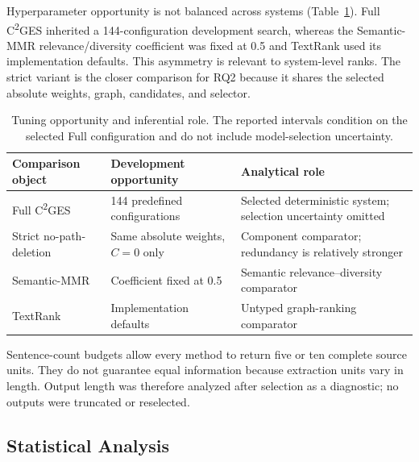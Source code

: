 \documentclass[applsci,article,submit,moreauthors]{Definitions/mdpi}
\newcommand{\cges}{C\textsuperscript{2}GES}
\begin{document}
Hyperparameter opportunity is not balanced across systems (Table~\ref{tab:tuning-opportunity}). Full \cges{} inherited a 144-configuration development search, whereas the Semantic-MMR relevance/diversity coefficient was fixed at 0.5 and TextRank used its implementation defaults. This asymmetry is relevant to system-level ranks. The strict variant is the closer comparison for RQ2 because it shares the selected absolute weights, graph, candidates, and selector.

\begin{table}[H]
\caption{Tuning opportunity and inferential role. The reported intervals condition on the selected Full configuration and do not include model-selection uncertainty.}
\label{tab:tuning-opportunity}\centering\small
\begin{tabular}{p{}p{}p{}}
\toprule
Comparison object & Development opportunity & Analytical role\\
\midrule
Full \cges{} & 144 predefined configurations & Selected deterministic system; selection uncertainty omitted\\
Strict no-path-deletion & Same absolute weights, $C=0$ only & Component comparator; redundancy is relatively stronger\\
Semantic-MMR & Coefficient fixed at 0.5 & Semantic relevance--diversity comparator\\
TextRank & Implementation defaults & Untyped graph-ranking comparator\\
\bottomrule
\end{tabular}
\end{table}

Sentence-count budgets allow every method to return five or ten complete source units. They do not guarantee equal information because extraction units vary in length. Output length was therefore analyzed after selection as a diagnostic; no outputs were truncated or reselected.

\subsection{Statistical Analysis}
\end{document}
